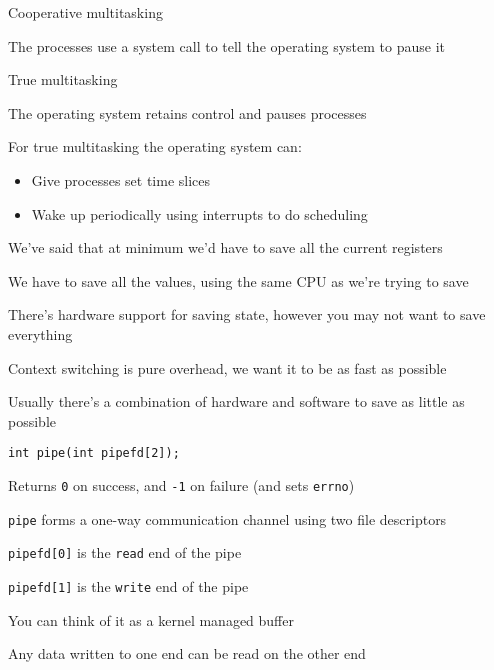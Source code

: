   \begin{slide}
    
    Cooperative multitasking

    \leftspace{}The processes use a system call to tell the operating system to
    pause it
    \medskip

    True multitasking

    \leftspace{}The operating system retains control and pauses processes
    \bigskip

    For true multitasking the operating system can:
    \begin{itemize}
      \item Give processes set time slices
      \item Wake up periodically using interrupts to do scheduling
    \end{itemize}
  \end{slide}

  \begin{slide}
    

    We've said that at minimum we'd have to save all the current registers

    \leftspace{}We have to save all the values, using the same CPU as we're
    trying to save
    \medskip

    There's hardware support for saving state, however you may not want to save
    everything
    \medskip

    Context switching is pure overhead, we want it to be as fast as possible
    \bigskip

    Usually there's a combination of hardware and software to save as little as
    possible
  \end{slide}

  \begin{slide}

    \texttt{int pipe(int pipefd[2]);}
    \medskip

    Returns \texttt{0} on success, and \texttt{-1} on failure
    (and sets \texttt{errno})
    \medskip

    \texttt{pipe} forms a one-way communication channel using two file
    descriptors

    \leftspace{}\texttt{pipefd[0]} is the \texttt{read} end of the pipe

    \leftspace{}\texttt{pipefd[1]} is the \texttt{write} end of the pipe
    \medskip

    You can think of it as a kernel managed buffer

    \leftspace{}Any data written to one end can be read on the other end
  \end{slide}

